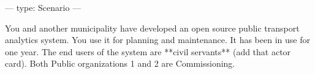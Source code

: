 ---
type: Scenario
---

You and another municipality have developed an open source public transport analytics system. You use it for planning and maintenance. It has been in use for one year. The end users of the system are **civil servants** (add that actor card). Both Public organizations 1 and 2 are Commissioning.
